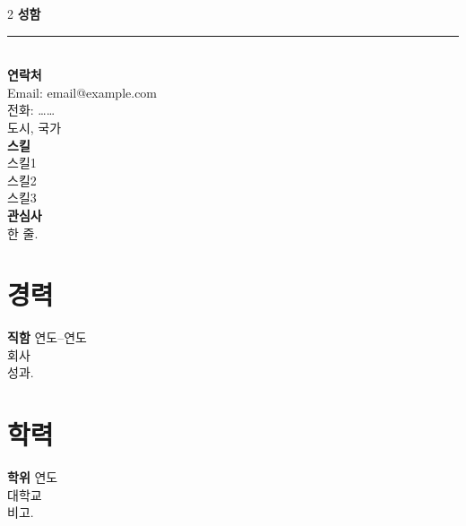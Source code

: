 \documentclass[11pt,a4paper]{article}
\begin{document}
\begin{paracol}{2}
\setlength{\parindent}{0pt}
{\large \textbf{성함}}\\[0.2em]
\rule{\linewidth}{2.2cm}\\[0.5em]
\textbf{연락처}\\
Email: email@example.com\\
전화: ……\\
도시, 국가\\[0.6em]
\textbf{스킬}\\
스킬1\\ 스킬2\\ 스킬3\\[0.6em]
\textbf{관심사}\\
한 줄.

\switchcolumn
\section*{경력}
\textbf{직함} \hfill 연도--연도 \\
회사 \\
성과.

\section*{학력}
\textbf{학위} \hfill 연도 \\
대학교 \\
비고.
\end{paracol}
\end{document}
